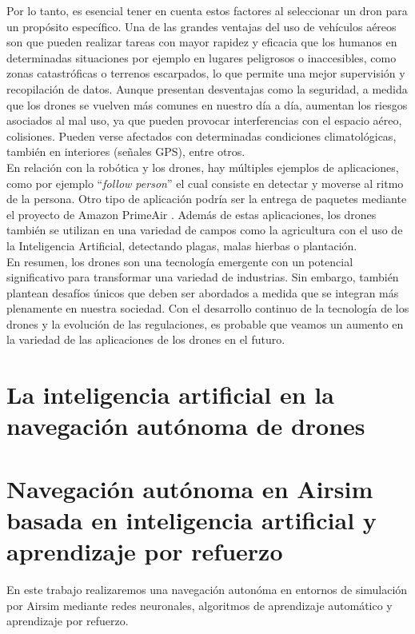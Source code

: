 Por lo tanto, es esencial tener en cuenta estos factores al seleccionar un dron para un
propósito específico. Una de las grandes ventajas del uso de vehículos aéreos son que pueden
realizar tareas con mayor rapidez y eficacia que los humanos en determinadas situaciones por
ejemplo en lugares peligrosos o inaccesibles, como zonas catastróficas o terrenos escarpados,
lo que permite una mejor supervisión y recopilación de datos.\hfill
Aunque presentan desventajas como la seguridad, a medida que los drones se vuelven más
comunes en nuestro día a día, aumentan los riesgos asociados al mal uso, ya que pueden
provocar interferencias con el espacio aéreo, colisiones. Pueden verse afectados con
determinadas condiciones climatológicas, también en interiores (señales GPS), entre otros. \\

En relación con la robótica y los drones, hay múltiples ejemplos de aplicaciones, como por
ejemplo  “\textit{follow person}” \cite{PersonFollowing} el cual consiste en detectar y moverse al ritmo de la persona.
Otro tipo de aplicación podría ser la entrega de paquetes mediante el proyecto de Amazon PrimeAir \cite{AmazonPrimeAir}.
Además de estas aplicaciones, los drones también se utilizan en una variedad de campos como
la agricultura con el uso de la Inteligencia Artificial, detectando plagas, malas hierbas o
plantación. \\

En resumen, los drones son una tecnología emergente con un potencial significativo para
transformar una variedad de industrias. Sin embargo, también plantean desafíos únicos que
deben ser abordados a medida que se integran más plenamente en nuestra sociedad. Con el
desarrollo continuo de la tecnología de los drones y la evolución de las regulaciones, es
probable que veamos un aumento en la variedad de las aplicaciones de los
drones en el futuro.

\newpage
\section{La inteligencia artificial en la navegación autónoma de drones}
\label{sec:IA}



\newpage
\section{Navegación autónoma en Airsim basada en inteligencia artificial y aprendizaje por refuerzo}
\label{sec:Navegación autónoma}

En este trabajo realizaremos una navegación autonóma en entornos de simulación por Airsim mediante redes neuronales, algoritmos de aprendizaje automático y aprendizaje 
por refuerzo.


